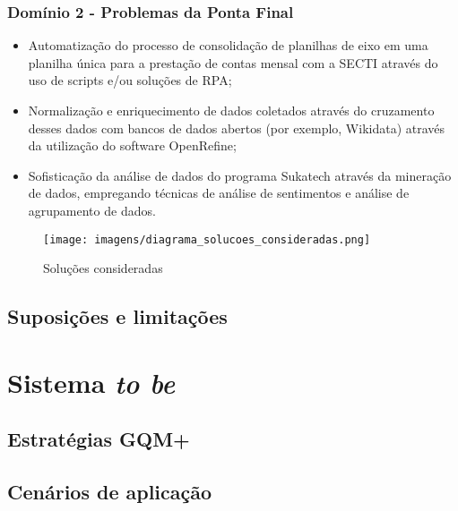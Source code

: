 \documentclass[
	12pt,				%
	openright,			%
	twoside,			%
	a4paper,			%
	english,			%
	french,				%
	spanish,			%
	brazil,				%
	]{abntex2}
\begin{document}
\section{Domínio 2 - Problemas da Ponta Final}

\begin{itemize}
  \item Automatização do processo de consolidação de planilhas de eixo em uma planilha única para a prestação de contas mensal com a SECTI através do uso de scripts e/ou soluções de RPA;
  \item Normalização e enriquecimento de dados coletados através do cruzamento desses dados com bancos de dados abertos (por exemplo, Wikidata) através da utilização do software OpenRefine;
  \item Sofisticação da análise de dados do programa Sukatech através da mineração de dados, empregando técnicas de análise de sentimentos e análise de agrupamento de dados.
\end{itemize}


\begin{figure}[h]
	\caption{\label{rep_solucoes}Soluções consideradas}
	\begin{center}

  \texttt{[image: imagens/diagrama\_solucoes\_consideradas.png]}
	\end{center}
\end{figure}

\chapter{Suposições e limitações}




\part{Sistema \textit{to be}}
\chapter{Estratégias GQM+}
\chapter{Cenários de aplicação}
\end{document}
